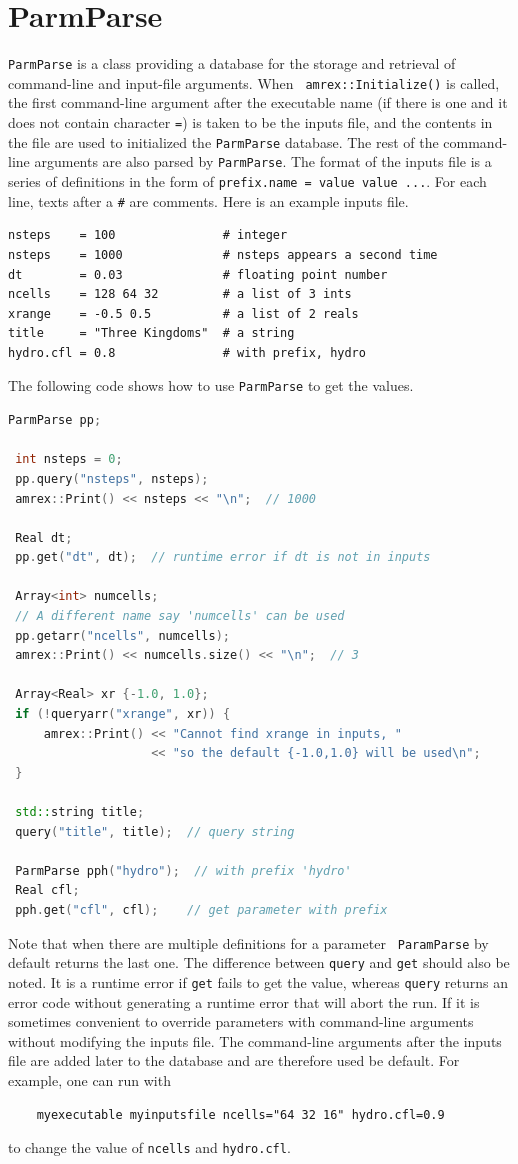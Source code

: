 \section{ParmParse}

{\tt ParmParse} is a class providing a database for the storage and
retrieval of command-line and input-file arguments.  When {\tt
  amrex::Initialize()} is called, the first command-line argument
after the executable name (if there is one and it does not contain
character {\tt =}) is taken to be the inputs file, and the contents in
the file are used to initialized the {\tt ParmParse} database.  The
rest of the command-line arguments are also parsed by {\tt ParmParse}.
The format of the inputs file is a series of definitions in the form
of {\tt prefix.name = value value ...}.  For each line, texts after a
{\tt \#} are comments.  Here is an example inputs file.
\begin{verbatim}
nsteps    = 100               # integer
nsteps    = 1000              # nsteps appears a second time
dt        = 0.03              # floating point number
ncells    = 128 64 32         # a list of 3 ints
xrange    = -0.5 0.5          # a list of 2 reals
title     = "Three Kingdoms"  # a string
hydro.cfl = 0.8               # with prefix, hydro 
\end{verbatim}
The following code shows how to use {\tt ParmParse} to get the values.
\begin{lstlisting}[language=cpp]
 ParmParse pp;
 
 int nsteps = 0;
 pp.query("nsteps", nsteps);
 amrex::Print() << nsteps << "\n";  // 1000
 
 Real dt;
 pp.get("dt", dt);  // runtime error if dt is not in inputs
 
 Array<int> numcells;
 // A different name say 'numcells' can be used
 pp.getarr("ncells", numcells);
 amrex::Print() << numcells.size() << "\n";  // 3
 
 Array<Real> xr {-1.0, 1.0};
 if (!queryarr("xrange", xr)) {
     amrex::Print() << "Cannot find xrange in inputs, "
                    << "so the default {-1.0,1.0} will be used\n";
 }
 
 std::string title;
 query("title", title);  // query string
 
 ParmParse pph("hydro");  // with prefix 'hydro'
 Real cfl;
 pph.get("cfl", cfl);    // get parameter with prefix
\end{lstlisting}
Note that when there are multiple definitions for a parameter {\tt
  ParamParse} by default returns the last one.  The difference between
{\tt query} and {\tt get} should also be noted.  It is a runtime error
if {\tt get} fails to get the value, whereas {\tt query} returns an
error code without generating a runtime error that will abort the run.
If it is sometimes convenient to override parameters with command-line
arguments without modifying the inputs file.  The command-line
arguments after the inputs file are added later to the database and
are therefore used be default.  For example, one can run with
\begin{verbatim}
    myexecutable myinputsfile ncells="64 32 16" hydro.cfl=0.9
\end{verbatim}
to change the value of {\tt ncells} and {\tt hydro.cfl}.

